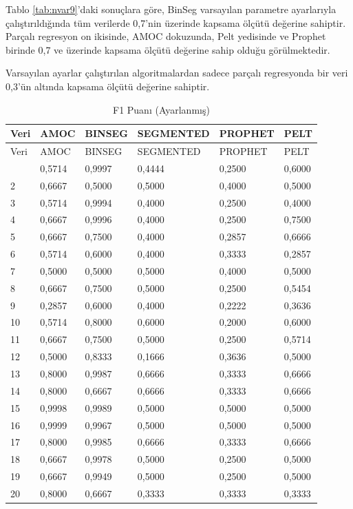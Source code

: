 \documentclass[12pt,twoside]{deuthesis}
\begin{document}
Tablo \ref{tab:nvar9}'daki sonuçlara göre, BinSeg varsayılan parametre ayarlarıyla çalıştırıldığında tüm verilerde 0,7'nin üzerinde kapsama ölçütü değerine sahiptir. Parçalı regresyon on ikisinde, AMOC dokuzunda, Pelt yedisinde ve Prophet birinde 0,7 ve üzerinde kapsama ölçütü değerine sahip olduğu görülmektedir.

Varsayılan ayarlar çalıştırılan algoritmalardan sadece parçalı regresyonda bir veri 0,3'ün altında kapsama ölçütü değerine sahiptir.

\begin{longtable}[]{@{}llllll@{}}
\caption{\label{tab:nvar10} F1 Puanı (Ayarlanmış)}\tabularnewline
\toprule\noalign{}
Veri & AMOC & BINSEG & SEGMENTED & PROPHET & PELT \\
\midrule\noalign{}
\endfirsthead
\toprule\noalign{}
Veri & AMOC & BINSEG & SEGMENTED & PROPHET & PELT \\
\midrule\noalign{}
\endhead
\bottomrule\noalign{}
\endlastfoot
1 & 0,5714 & 0,9997 & 0,4444 & 0,2500 & 0,6000 \\
2 & 0,6667 & 0,5000 & 0,5000 & 0,4000 & 0,5000 \\
3 & 0,5714 & 0,9994 & 0,4000 & 0,2500 & 0,4000 \\
4 & 0,6667 & 0,9996 & 0,4000 & 0,2500 & 0,7500 \\
5 & 0,6667 & 0,7500 & 0,4000 & 0,2857 & 0,6666 \\
6 & 0,5714 & 0,6000 & 0,4000 & 0,3333 & 0,2857 \\
7 & 0,5000 & 0,5000 & 0,5000 & 0,4000 & 0,5000 \\
8 & 0,6667 & 0,7500 & 0,5000 & 0,2500 & 0,5454 \\
9 & 0,2857 & 0,6000 & 0,4000 & 0,2222 & 0,3636 \\
10 & 0,5714 & 0,8000 & 0,6000 & 0,2000 & 0,6000 \\
11 & 0,6667 & 0,7500 & 0,5000 & 0,2500 & 0,5714 \\
12 & 0,5000 & 0,8333 & 0,1666 & 0,3636 & 0,5000 \\
13 & 0,8000 & 0,9987 & 0,6666 & 0,3333 & 0,6666 \\
14 & 0,8000 & 0,6667 & 0,6666 & 0,3333 & 0,6666 \\
15 & 0,9998 & 0,9989 & 0,5000 & 0,5000 & 0,5000 \\
16 & 0,9999 & 0,9967 & 0,5000 & 0,5000 & 0,5000 \\
17 & 0,8000 & 0,9985 & 0,6666 & 0,3333 & 0,6666 \\
18 & 0,6667 & 0,9978 & 0,5000 & 0,2500 & 0,5000 \\
19 & 0,6667 & 0,9949 & 0,5000 & 0,2500 & 0,5000 \\
20 & 0,8000 & 0,6667 & 0,3333 & 0,3333 & 0,3333 \\
\end{longtable}
\end{document}
